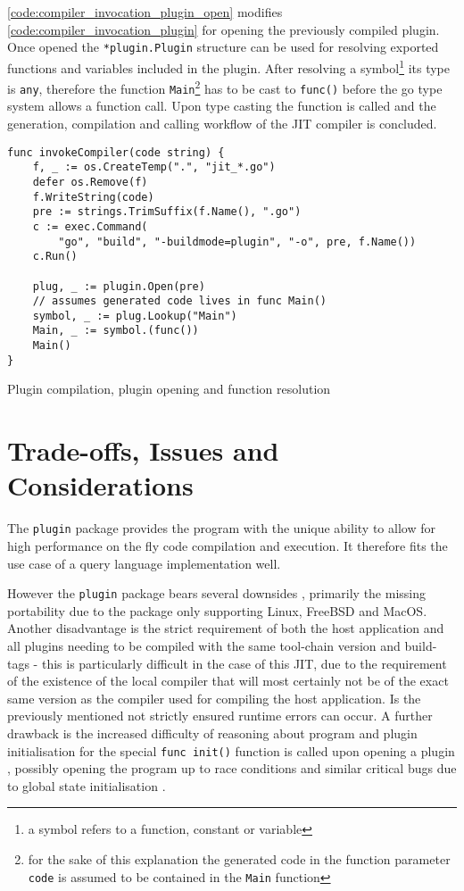 \autoref{code:compiler_invocation_plugin_open} modifies
\autoref{code:compiler_invocation_plugin} for opening the previously compiled
plugin. Once opened the \texttt{*plugin.Plugin} structure can be used
for resolving exported functions and variables included in the plugin. After
resolving a symbol\footnote{a symbol refers to a function, constant or
variable} its type is \texttt{any}, therefore the function
\texttt{Main}\footnote{for the sake of this explanation the generated
code in the function parameter \texttt{code} is assumed to be contained in the
\texttt{Main} function} has to be cast to \texttt{func()}
before the go type system allows a function call. Upon type casting the
function is called and the generation, compilation and calling workflow of the
JIT compiler is concluded.

\begin{listing}[H]
    \begin{verbatim}
func invokeCompiler(code string) {
    f, _ := os.CreateTemp(".", "jit_*.go")
    defer os.Remove(f)
    f.WriteString(code)
    pre := strings.TrimSuffix(f.Name(), ".go")
    c := exec.Command(
        "go", "build", "-buildmode=plugin", "-o", pre, f.Name())
    c.Run()

    plug, _ := plugin.Open(pre)
    // assumes generated code lives in func Main()
    symbol, _ := plug.Lookup("Main")
    Main, _ := symbol.(func())
    Main()
}
    \end{verbatim}
    \caption{Plugin compilation, plugin opening and function resolution}
    \label{code:compiler_invocation_plugin_open}
\end{listing}

\section{Trade-offs, Issues and Considerations}

The \texttt{plugin} package provides the program with the unique ability to
allow for high performance on the fly code compilation and execution. It
therefore fits the use case of a query language implementation well.

However the \texttt{plugin} package bears several downsides
\cite[Warnings]{go_plugin}, primarily the missing portability due to the
package only supporting Linux, FreeBSD and MacOS. Another disadvantage is the
strict requirement of both the host application and all plugins needing to be
compiled with the same tool-chain version and build-tags - this is particularly
difficult in the case of this JIT, due to the requirement of the existence of
the local compiler that will most certainly not be of the exact same version as
the compiler used for compiling the host application. Is the previously
mentioned not strictly ensured runtime errors can occur. A further drawback is
the increased difficulty of reasoning about program and plugin initialisation
for the special \texttt{func init()} function is called upon opening a
plugin \cite[Overview]{go_plugin}, possibly opening the program up to race
conditions and similar critical bugs due to global state initialisation
\cite[The init function]{go_effective}.

